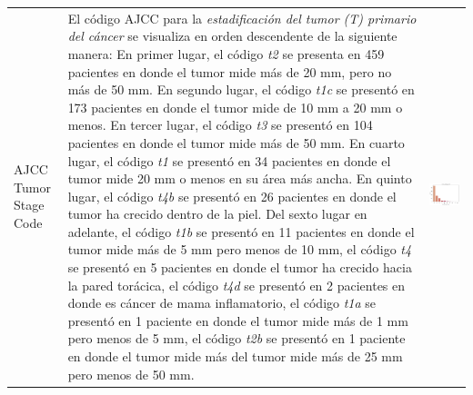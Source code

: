 \begin{table}[!htb]
	\footnotesize
	\begin{threeparttable}
		\begin{tabular}{p{2.5cm} p{7.5cm} p{6.5cm}} \toprule
			AJCC Tumor Stage Code 
			& El código AJCC para la \textit{estadificación del tumor (T) primario del cáncer} se visualiza en orden descendente de la siguiente manera: En primer lugar, el código \textit{t2} se presenta en 459 pacientes en donde el tumor mide más de 20 mm, pero no más de 50 mm. En segundo lugar, el código \textit{t1c} se presentó en 173 pacientes en donde el tumor mide de 10 mm a 20 mm o menos. En tercer lugar, el código \textit{t3} se presentó en 104 pacientes en donde el tumor mide más de 50 mm. En cuarto lugar, el código \textit{t1} se presentó en 34 pacientes en donde el tumor mide 20 mm o menos en su área más ancha. En quinto lugar, el código \textit{t4b} se presentó en 26 pacientes en donde el tumor ha crecido dentro de la piel. Del sexto lugar en adelante, el código \textit{t1b} se presentó en 11 pacientes en donde el tumor mide más de 5 mm pero menos de 10 mm, el código \textit{t4} se presentó en 5 pacientes en donde el tumor ha crecido hacia la pared torácica, el código \textit{t4d} se presentó en 2 pacientes en donde es cáncer de mama inflamatorio, el código \textit{t1a} se presentó en 1 paciente en donde el tumor mide más de 1 mm pero menos de 5 mm, el código \textit{t2b} se presentó en 1 paciente en donde el tumor mide más del tumor mide más de 25 mm pero menos de 50 mm.
			& \begin{center}\includegraphics[width=1\linewidth]{NOTEBOOK/IMAGENES_DESCRIPTIVAS/5_tumor_stage_code}\end{center}

\end{tabular}
\end{threeparttable}
\end{table}
